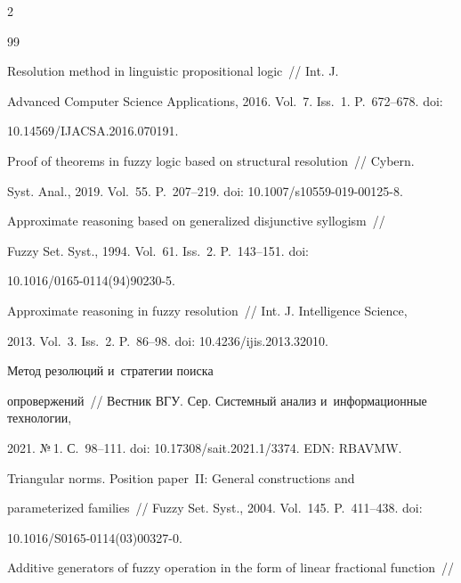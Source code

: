 \begin{multicols}{2}
{{\begin{thebibliography}{99}


 Resolution method in linguistic propositional logic~// Int. J. 


Advanced Computer Science Applications, 2016. Vol.~7. Iss.~1. P.~672--678. doi: 


10.14569/IJACSA.2016.070191.







 Proof of theorems in fuzzy logic based on structural resolution~// Cybern. 


Syst. Anal., 2019. Vol.~55. P.~207--219. doi: 10.1007/s10559-019-00125-8.







 Approximate reasoning based on generalized disjunctive syllogism~// 


Fuzzy Set. Syst., 1994. Vol.~61. Iss.~2. P.~143--151. doi:  


10.1016/0165-0114(94)90230-5.




 Approximate reasoning in fuzzy resolution~// Int. J. Intelligence Science, 


2013. Vol.~3. Iss.~2. P.~86--98. doi: 10.4236/ijis.2013.32010.




 Метод резолюций и~стратегии поиска 


опровержений~// Вестник ВГУ. Сер. Системный анализ и~информационные технологии, 


2021. №\,1. С.~98--111. doi: 10.17308/sait.2021.1/3374. EDN: RBAVMW.




 Triangular norms. Position paper~II: General constructions and 


parameterized families~// Fuzzy Set. Syst., 2004. Vol.~145. P.~411--438. doi:  


10.1016/S0165-0114(03)00327-0.










 Additive generators of fuzzy operation in the form of linear fractional function~// 



\end{thebibliography}}}
\end{multicols}
